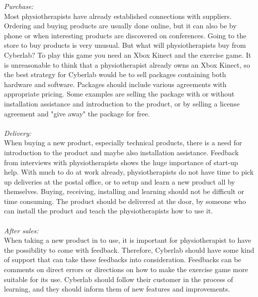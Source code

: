 \emph{Purchase:} \\
Most physiotherapists have already established connections with suppliers. Ordering and buying products are usually done online, but it can also be by phone or when interesting products are discovered on conferences. Going to the store to buy products is very unusual. But what will physiotherapists buy from Cyberlab? To play this game you need an Xbox Kinect and the exercise game. It is unreasonable to think that a physiotherapist already owns an Xbox Kinect, so the best strategy for Cyberlab would be to sell packages containing both hardware and software.  Packages should include various agreements with appropriate pricing. Some examples are selling the package with or without installation assistance and introduction to the product, or by selling a license agreement and "give away" the package for free.\\ \\
\emph{Delivery:}\\
When buying a new product, especially technical products, there is a need for introduction to the product and maybe also installation assistance. Feedback from interviews with physiotherapists shows the huge importance of start-up help. With much to do at work already, physiotherapists do not have time to pick up deliveries at the postal office, or to setup and learn a new product all by themselves. Buying, receiving, installing and learning should not be difficult or time consuming. The product should be delivered at the door, by someone who can install the product and teach the physiotherapists how to use it.\\ \\
\emph{After sales:}\\
When taking a new product in to use, it is important for physiotherapist to have the possibility to come with feedback. Therefore, Cyberlab should have some kind of support that can take these feedbacks into consideration. Feedbacks can be comments on direct errors or directions on how to make the exercise game more suitable for its use. Cyberlab should follow their customer in the process of learning, and they should inform them of new features and improvements.  
